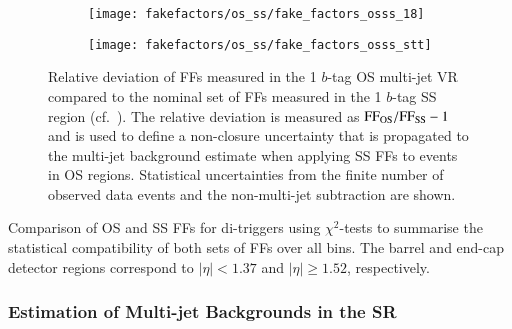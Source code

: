 \begin{figure}[htbp]
  \centering

  \begin{subfigure}[t]{0.48\textwidth}
    \texttt{[image: fakefactors/os\_ss/fake\_factors\_osss\_18]}
    \label{fig:fake_factor_OSSS_dtt}
  \end{subfigure}\hfill%
  \begin{subfigure}[t]{0.48\textwidth}
    \texttt{[image: fakefactors/os\_ss/fake\_factors\_osss\_stt]}
    \label{fig:fake_factor_OSSS_stt}
  \end{subfigure}

  \caption{Relative deviation of FFs measured in the 1 $b$-tag OS multi-jet VR
    compared to the nominal set of FFs measured in the 1 $b$-tag SS region (cf.\
    ). The relative deviation
    is measured as $\text{FF}_\text{OS} / \text{FF}_\text{SS} - 1$ and is used to define a
    non-closure uncertainty that is propagated to the multi-jet background
    estimate when applying SS FFs to events in OS regions. Statistical
    uncertainties from the finite number of observed data events and the
    non-multi-jet subtraction are shown.}
  \label{fig:fake_factor_OSSS}
\end{figure}


\begin{table}[htbp]
  \centering

  \caption{Comparison of OS and SS FFs for di-\tauhadvis triggers using
    $\chi^2$-tests to summarise the statistical compatibility of both sets of
    FFs over all \tauhadvis \pT bins. The barrel and end-cap detector regions
    correspond to \tauhadvis $|\eta| < 1.37$ and $|\eta| \geq 1.52$,
    respectively.}%
  \label{tab:fake_factor_osss_chi2test}

  
\end{table}


\subsubsection{Estimation of Multi-jet Backgrounds in the \hadhad SR}

